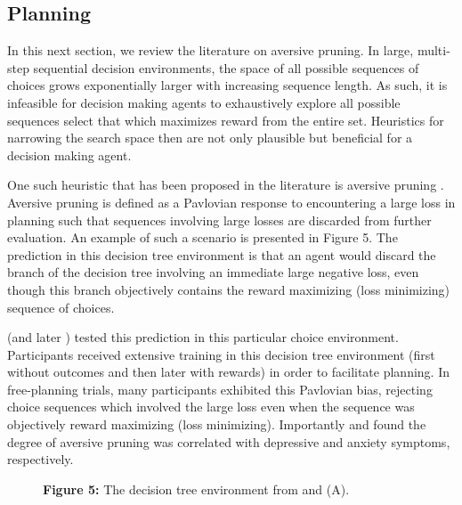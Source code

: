 \documentclass[11pt]{article} %
\begin{document}
\subsection{Planning}

In this next section, we review the literature on aversive pruning. In large, multi-step sequential decision environments, the space of all possible sequences of choices grows exponentially larger with increasing sequence length. As such, it is infeasible for decision making agents to exhaustively explore all possible sequences select that which maximizes reward from the entire set. Heuristics for narrowing the search space then are not only plausible but beneficial for a decision making agent.

One such heuristic that has been proposed in the literature is aversive pruning \citep{Huys2012}. Aversive pruning is defined as a Pavlovian response to encountering a large loss in planning such that sequences involving large losses are discarded from further evaluation. An example of such a scenario is presented in Figure 5. The prediction in this decision tree environment is that an agent would discard the branch of the decision tree involving an immediate large negative loss, even though this branch objectively contains the reward maximizing (loss minimizing) sequence of choices.

\cite{Huys2012} (and later \cite{Lally2017}) tested this prediction in this particular choice environment. Participants received extensive training in this decision tree environment (first without outcomes and then later with rewards) in order to facilitate planning. In free-planning trials, many participants exhibited this Pavlovian bias, rejecting choice sequences which involved the large loss even when the sequence was objectively reward maximizing (loss minimizing). Importantly \cite{Huys2012} and \cite{Lally2017} found the degree of aversive pruning was correlated with depressive and anxiety symptoms, respectively.

\begin{figure}
  \centerline{%
  }
  \par \textbf{Figure 5:} The decision tree environment from \cite{Huys2012} and \cite{Lally2017} (A).
\end{figure}
\end{document}
